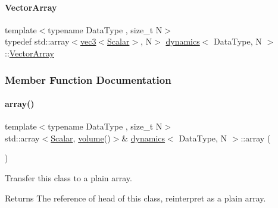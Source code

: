 \mbox{\label{classdynamics_a41e25703d6668a66d96a1db3dc5df03b}} 
\paragraph{\texorpdfstring{Vector\+Array}{VectorArray}}
{\footnotesize\ttfamily template$<$typename Data\+Type , size\+\_\+t N$>$ \\
typedef std\+::array$<$\mbox{\hyperlink{structvec3}{vec3}}$<$\mbox{\hyperlink{classdynamics_a444c7534e86115117798563cb0e43cde}{Scalar}}$>$, N$>$ \mbox{\hyperlink{classdynamics}{dynamics}}$<$ Data\+Type, N $>$\+::\mbox{\hyperlink{classdynamics_a41e25703d6668a66d96a1db3dc5df03b}{Vector\+Array}}}



\subsubsection{Member Function Documentation}
\mbox{\label{classdynamics_add2d27f86c6f415999e9e7dd05cc8025}} 
\paragraph{\texorpdfstring{array()}{array()}}
{\footnotesize\ttfamily template$<$typename Data\+Type , size\+\_\+t N$>$ \\
std\+::array$<$\mbox{\hyperlink{classdynamics_a444c7534e86115117798563cb0e43cde}{Scalar}}, \mbox{\hyperlink{classdynamics_ada4a2418d86de3072e1a238a95e6bdb2}{volume}}()$>$\& \mbox{\hyperlink{classdynamics}{dynamics}}$<$ Data\+Type, N $>$\+::array (\begin{DoxyParamCaption}{ }\end{DoxyParamCaption})\hspace{0.3cm}{\ttfamily [inline]}}



Transfer this class to a plain array. 

\begin{DoxyReturn}{Returns}
The reference of head of this class, reinterpret as a plain array. 
\end{DoxyReturn}
\mbox{\label{classdynamics_a4f6f246917f12269d3bd4a428bd40752}} 
